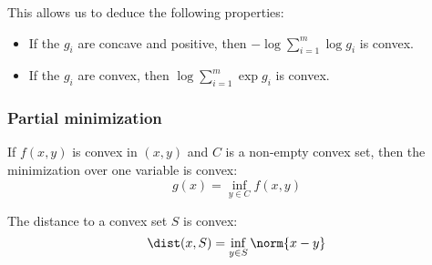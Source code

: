 \begin{example}
    This allows us to deduce the following properties:
    \begin{itemize}
        \item If the $g_i$ are concave and positive, then $-\log\sum_{i=1}^m\log g_i$ is convex.
        \item If the $g_i$ are convex, then $\log\sum_{i=1}^m\exp g_i$ is convex.
    \end{itemize}
\end{example}

\subsubsection{Partial minimization}
\begin{property}
   If $f(x,y)$ is convex in $(x, y)$ and $C$ is a non-empty convex set, then the minimization over one variable is convex:
   \begin{equation*}
    g(x) = \inf_{y\in C} f(x,y)
   \end{equation*}
\end{property}

\begin{example}
    The distance to a convex set $S$ is convex:
    \begin{equation*}
        \dist(x, S) = \inf_{y\in S} \norm{x-y}
    \end{equation*}
\end{example}

\newpage